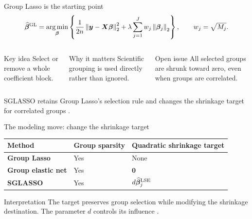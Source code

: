 \documentclass[newPxFont,nosectionpage]{beamer}
\newcommand{\bbeta}{\bm{\beta}}
\newcommand{\bX}{\bm{X}}
\newcommand{\by}{\bm{y}}
\newcommand{\norm}[1]{\left\lVert #1 \right\rVert}
\newcommand{\argmin}{\operatorname*{arg\,min}}
\begin{document}
\begin{frame}{Group Lasso is the starting point}
\small
\[
  \widehat{\bbeta}^{\rm GL}=
  \argmin_{\bbeta}\left\{
  \frac{1}{2n}\norm{\by-\bX\bbeta}_2^2+
  \lambda\sum_{j=1}^{J}w_j\norm{\bbeta_j}_2\right\},
  \qquad w_j=\sqrt{M_j}.
\]
\begin{columns}[T,onlytextwidth]
\begin{block}{Key idea}
Select or remove a whole coefficient block.
\end{block}
\begin{block}{Why it matters}
Scientific grouping is used directly rather than ignored.
\end{block}
\begin{block}{Open issue}
All selected groups are shrunk toward zero, even when groups are correlated.
\end{block}
\end{columns}
\vspace{0.35em}
\small\centering
\scriptsize SGLASSO retains Group Lasso's selection rule and changes the shrinkage target for correlated groups \citep{yuan2006model}.
\end{frame}

\begin{frame}{The modeling move: change the shrinkage target}
\small
\begin{center}
\renewcommand{\arraystretch}{1.45}
\begin{tabular}{>{\bfseries}l p{} p{}}
\toprule
Method & Group sparsity & Quadratic shrinkage target \\
\midrule
Group Lasso & Yes & None \\
Group elastic net & Yes & $\bm{0}$ \\
SGLASSO & Yes & $d\widehat{\bbeta}^{\rm LSE}_j$ \\
\bottomrule
\end{tabular}
\end{center}
\vspace{0.8em}
\begin{block}{Interpretation}
The target preserves group selection while modifying the shrinkage destination. The parameter $d$ controls its influence \citep{zou2005regularization,helwig2024versatile,james1961estimation,arashi2021slasso}.
\end{block}
\end{frame}
\end{document}

